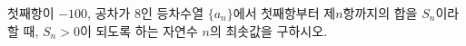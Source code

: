 첫째항이 $-100$, 공차가 $8$인 등차수열 $\{a_n\}$에서 첫째항부터 제$n$항까지의 합을 $S_n$이라 할 때, $S_n>0$이 되도록 하는 자연수 $n$의 최솟값을 구하시오.
